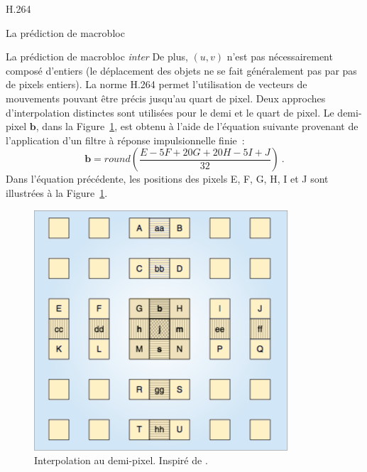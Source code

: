 \documentclass{article}
\begin{document}
\begin{section}{H.264}
\begin{subsection}{La prédiction de macrobloc}
\begin{subsubsection}{La prédiction de macrobloc \textit{inter}}
De plus, $(u,v)$ n'est  pas nécessairement composé d'entiers (le déplacement des objets ne se fait généralement pas par pas de pixels entiers). La norme H.264 permet
l'utilisation de vecteurs de mouvements pouvant être précis jusqu'au quart de pixel.
Deux approches d'interpolation distinctes sont utilisées pour le demi et le
quart de pixel. Le demi-pixel $\mathbf{b}$, dans la Figure~\ref{fig-HalfPel},
est obtenu à l'aide de l'équation suivante provenant de l'application d'un filtre à réponse impulsionnelle finie~:
\begin{equation}
\mathbf{b} = round \left(\frac{E - 5F + 20G + 20H - 5I + J}{32} \right)\:.
\end{equation}
Dans l'équation précédente, les positions des pixels E, F, G, H, I et J sont illustrées à la Figure~\ref{fig-HalfPel}.
\begin{figure}[htb]
\centering
\includegraphics[scale=0.5]{images/HalfPel.png}
\caption{Interpolation au demi-pixel. Inspiré de \cite{richardson2003}.}
\label{fig-HalfPel}
\end{figure}


\end{subsubsection}
\end{subsection}
\end{section}
\end{document}
